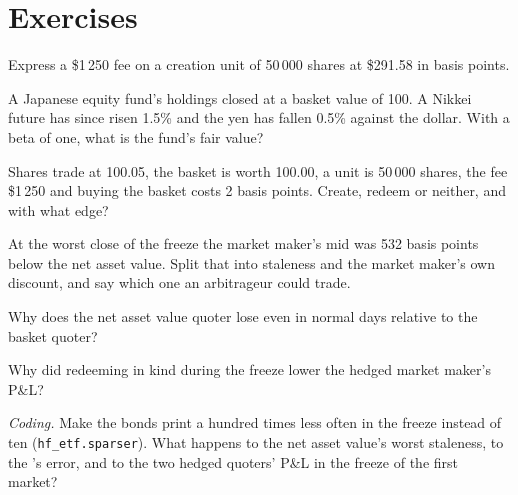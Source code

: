 \section{Exercises}

\begin{exercise}[$\star$]\label{exo:hf:etf-market-making:1}
Express a \$1\,250 fee on a creation unit of 50\,000 shares at \$291.58 in basis points.
\end{exercise}

\begin{exercise}[$\star$]\label{exo:hf:etf-market-making:2}
A Japanese equity fund's holdings closed at a basket value of 100. A Nikkei future has since risen 1.5\% and the yen has fallen 0.5\% against the
dollar. With a beta of one, what is the fund's fair value?
\end{exercise}

\begin{exercise}[$\star$]\label{exo:hf:etf-market-making:3}
Shares trade at 100.05, the basket is worth 100.00, a unit is 50\,000 shares, the fee \$1\,250 and buying the basket costs 2 basis points. Create,
redeem or neither, and with what edge?
\end{exercise}

\begin{exercise}[$\star\star$]\label{exo:hf:etf-market-making:4}
At the worst close of the freeze the market maker's mid was 532 basis points below the net asset value. Split that into staleness and the market
maker's own discount, and say which one an arbitrageur could trade.
\end{exercise}

\begin{exercise}[$\star\star$]\label{exo:hf:etf-market-making:5}
Why does the net asset value quoter lose even in normal days relative to the basket quoter?
\end{exercise}

\begin{exercise}[$\star\star$]\label{exo:hf:etf-market-making:6}
Why did redeeming in kind during the freeze lower the hedged market maker's P\&L?
\end{exercise}

\begin{exercise}[$\star\star\star$]\label{exo:hf:etf-market-making:7}
\emph{Coding.} Make the bonds print a hundred times less often in the freeze instead of ten (\texttt{hf\_etf.sparser}). What happens to the net
asset value's worst staleness, to the 's error, and to the two hedged quoters' P\&L in the freeze of the first market?
\end{exercise}

